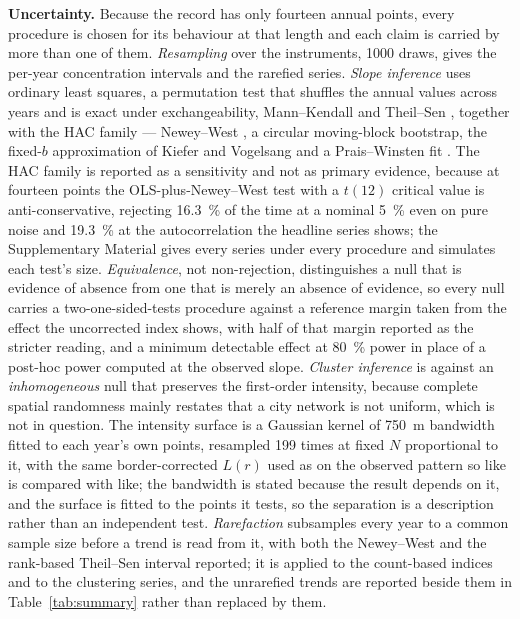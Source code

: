 \documentclass{article}
\newcommand{\nwSize}{16.3}
\newcommand{\nwSizeAr}{19.3}
\begin{document}
\noindent\textbf{Uncertainty.} Because the record has only fourteen annual points, every
procedure is chosen for its behaviour at that length and each claim is carried by more than one
of them. \emph{Resampling} \cite{efron1979bootstrap} over the instruments, 1000 draws, gives the
per-year concentration intervals and the rarefied series. \emph{Slope inference} uses ordinary
least squares, a permutation test that shuffles the annual values across years and is exact under
exchangeability, Mann--Kendall \cite{mann1945nonparametric} and Theil--Sen
\cite{sen1968estimates}, together with the HAC family --- Newey--West
\cite{newey1987simple}, a circular moving-block bootstrap, the fixed-$b$ approximation of Kiefer
and Vogelsang \cite{kiefer2005simple} and a Prais--Winsten fit \cite{prais1954trend}. The HAC
family is reported as a sensitivity and not as primary evidence, because at fourteen points
the OLS-plus-Newey--West test with a $t(12)$ critical value is anti-conservative, rejecting
\SI{\nwSize}{\percent} of the time at a nominal \SI{5}{\percent} even on pure noise and
\SI{\nwSizeAr}{\percent} at the autocorrelation the headline series shows;
the Supplementary Material gives every series under every procedure and simulates each test's
size. \emph{Equivalence}, not non-rejection, distinguishes a null that is evidence of
absence from one that is merely an absence of evidence, so every null carries a two-one-sided-tests
procedure \cite{schuirmann1987comparison,lakens2018equivalence} against a reference margin taken
from the effect the uncorrected index shows, with half of that margin reported as the stricter
reading, and a minimum detectable effect at \SI{80}{\percent} power in place of a post-hoc power
computed at the observed slope. \emph{Cluster inference} is against an
\emph{inhomogeneous} null that preserves the first-order intensity, because complete spatial
randomness mainly restates that a city network is not uniform, which is not in question. The
intensity surface is a Gaussian kernel of \SI{750}{\meter} bandwidth fitted to each year's own
points, resampled \num{199} times at fixed $N$ proportional to it, with the same border-corrected
$L(r)$ used as on the observed pattern so like is compared with like; the bandwidth is stated
because the result depends on it, and the surface is fitted to the points it tests, so the
separation is a description rather than an independent test.
\emph{Rarefaction} subsamples every year to a common sample size before a trend is read from it,
with both the Newey--West and the rank-based Theil--Sen interval reported; it is applied to the
count-based indices and to the clustering series, and the unrarefied trends are reported beside
them in Table~\ref{tab:summary} rather than replaced by them.
\end{document}
